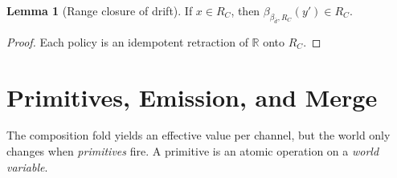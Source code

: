 \documentclass[journal,onecolumn,11pt]{IEEEtran}
\theoremstyle{definition}
\newtheorem{lemma}{Lemma}
\begin{document}
\begin{lemma}[Range closure of drift]\label{lem:drift-range}
If $x \in R_C$, then $\beta_{\beta_{\bar{d}}, R_C}(y') \in R_C$.
\end{lemma}

\begin{proof}
Each policy is an idempotent retraction of $\mathbb{R}$ onto $R_C$.
\end{proof}

\section{Primitives, Emission, and Merge}
\label{sec:emit}

The composition fold yields an effective value per channel, but the world only changes when \emph{primitives} fire. A primitive is an atomic operation on a \emph{world variable}.
\end{document}
